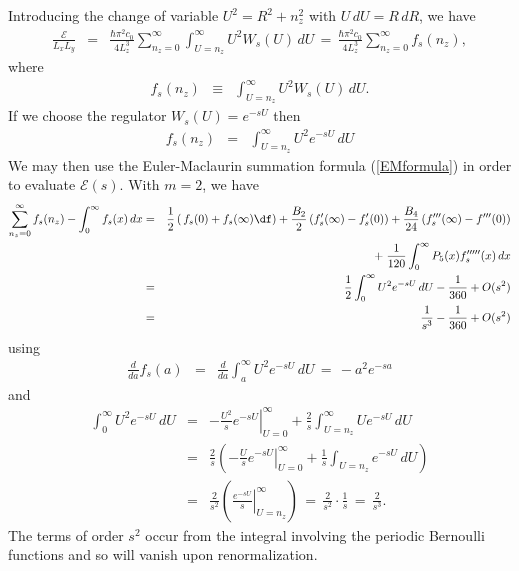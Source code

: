 \documentclass[sections]{tjwNOTES}
\newcommand\man[1]{\mathcal{#1}}
\newcommand\nz{n_{z}}
\newcommand\Lx{L_{x}}
\newcommand\Ly{L_{y}}
\newcommand\Lz{L_{z}}
\begin{document}
Introducing the change of variable $U^{2} = R^{2} + \nz^{2}$ with $U\,dU=R\,dR$, we have
\begin{eqnarray*}
    \frac{\man{E}}{\Lx\Ly} &=& \frac{\hbar \pi^{2} c_{0}}{4\Lz^{3}} \sum_{\nz=0}^{\infty} \int_{U=\nz}^{\infty} U^{2}W_{s}(U)\, dU \,=\, \frac{\hbar \pi^{2} c_{0}}{4\Lz^{3}} \sum_{\nz=0}^{\infty} f_{s}(\nz),
\end{eqnarray*}
where
\begin{eqnarray*}
    f_{s}(\nz) &\equiv& \int_{U=\nz}^{\infty} U^{2}W_{s}(U)\, dU.
\end{eqnarray*}
If we choose the regulator $W_{s}(U) = e^{-sU}$ then
\begin{eqnarray*}
    f_{s}(\nz) &=& \int_{U=\nz}^{\infty} U^{2}e^{-sU}\, dU
\end{eqnarray*}
We may then use the Euler-Maclaurin summation formula (\ref{EMformula}) in order to evaluate $\man{E}(s)$. With $m=2$, we have
\begin{eqnarray*}
    \sum_{\nz=0}^{\infty} f_{s}(\nz) - \int_{0}^{\infty}f_{s}(x)\,dx &=& \frac{1}{2}\left(\,f_{s}(0) + f_{s}(\infty)\df\right) + \frac{B_{2}}{2}\left(f_{s}'(\infty) - f_{s}'(0)\right) + \frac{B_{4}}{24}\left(f_{s}'''(\infty) - f'''(0)\right) \\
    & & + \;\frac{1}{120}\int_{0}^{\infty} P_{5}(x)f_{s}'''''(x) \,dx \\
    &=& \frac{1}{2}\int_{0}^{\infty} U^{2}e^{-sU}\, dU - \frac{1}{360} + O(s^{2}) \\
    &=& \frac{1}{s^{3}} - \frac{1}{360} + O(s^{2})
\end{eqnarray*}
using
\begin{eqnarray*}
    \frac{d}{da}f_{s}(a) &=& \frac{d}{da}\int_{a}^{\infty} U^{2}e^{-sU} \,dU \,=\, -a^{2}e^{-sa}
\end{eqnarray*}
and
\begin{eqnarray*}
    \int_{0}^{\infty} U^{2}e^{-sU}\, dU &=&  \left.-\frac{U^{2}}{s}e^{-sU} \right|_{U=0}^{\infty} + \frac{2}{s}\int_{U=\nz}^{\infty} Ue^{-sU}\, dU \\
      &=& \frac{2}{s}\left( \left.-\frac{U}{s}e^{-sU}\right|_{U=0}^{\infty} + \frac{1}{s}\int_{U=\nz}e^{-sU}\,dU \right) \\
      &=& \frac{2}{s^{2}}\left( \left.\frac{e^{-sU}}{s}\right|_{U=\nz}^{\infty}  \right) \,=\, \frac{2}{s^{2}} \cdot \frac{1}{s} \,=\, \frac{2}{s^{3}}.
\end{eqnarray*}
The terms of order $s^{2}$ occur from the integral involving the periodic Bernoulli functions and so will vanish upon renormalization.
\end{document}
